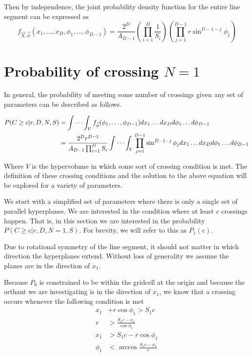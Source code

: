 \documentclass{article}
\begin{document}
Then by independence, the joint probability density function for the entire line segment can be expressed as 
\begin{equation} \label{eq:general pdf}
	f_{\vec{X},\vec{\phi}}(x_1, \hdots, x_D, \phi_1, \hdots, \phi_{D-1}) = \frac{2^D}{A_{D-1}}\left(\prod_{i=1}^D\frac{1}{S_i}\right)\left(\prod_{j=1}^{D-1}r\sin^{D-1-j}\phi_j\right)
\end{equation} 

\section{Probability of crossing $N=1$}
In general, the probability of meeting some number of crossings given any set of parameters can be described as follows.

\begin{align} 
	P(C\ge c|r, D, N, S)&=\idotsint_V f_{\vec\phi}(\phi_1,\hdots,\phi_{D-1})dx_1 \hdots dx_D d\phi_1 \hdots d\phi_{D-1}\\
	&= \frac{2^Dr^{D-1}}{A_{D-1}\prod_{i=1}^D S_i} \idotsint_V \prod_{j=1}^{D-1}\sin^{D-1-j}\phi_j dx_1\hdots dx_D d\phi_1 \hdots d\phi_{D-1} \label{eq:volume integral}
\end{align}

Where $V$ is the hypervolume in which some sort of crossing condition is met. The definition of these crossing conditions and the solution to the above equation will be
explored for a variety of parameters.

We start with a simplified set of parameters where there is only a single set of parallel hyperplanes. We are interested in the condition where at least $c$ crossings happen. 
That is, in this section we are interested in the probability $P(C\ge c | r, D, N=1, S)$. For brevity, we will refer to this as $P_1(c)$.

Due to rotational symmetry of the line segment, it should not matter in which direction the hyperplanes extend. Without loss of generality we assume the planes are in the
direction of $x_1$.

Because $P_0$ is constrained to be within the gridcell at the origin and because the orthant we are investigating is in the direction of $x_1$, we know that a crossing occurs
whenever the following condition is met
\begin{align}
	x_1 &+ r\cos{\phi_1} > S_1c\\
	r &> \frac{S_1c - x_1}{\cos{\phi_1}} \\
	x_1 &> S_1c - r\cos{\phi_1} \\
	\phi_1 &< \arccos{\frac{S_1c-x_1}{r}}
\end{align}
\end{document}

